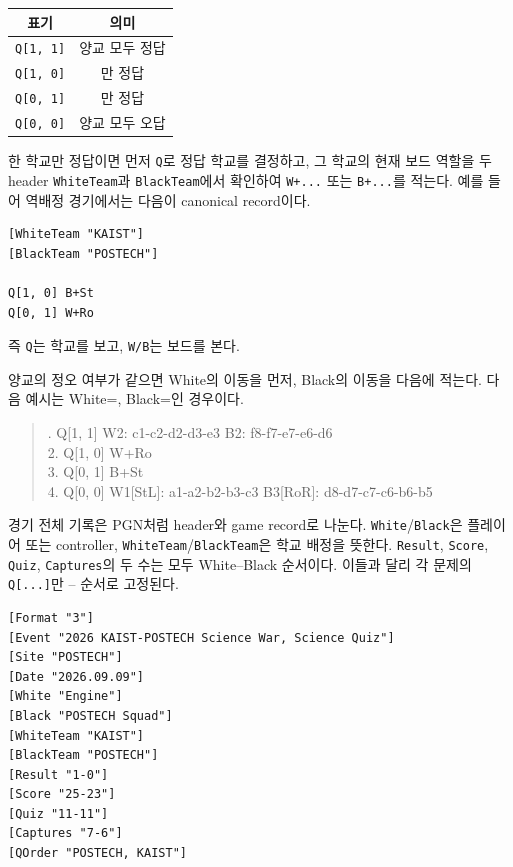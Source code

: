 \begin{center}\renewcommand{\arraystretch}{1.12}\begin{tabular}{@{}cc@{}}\toprule
표기 & 의미 \\\midrule
\texttt{Q[1, 1]} & 양교 모두 정답 \\
\texttt{Q[1, 0]} & \POSTECH{}만 정답 \\
\texttt{Q[0, 1]} & \KAIST{}만 정답 \\
\texttt{Q[0, 0]} & 양교 모두 오답 \\\bottomrule
\end{tabular}\end{center}

한 학교만 정답이면 먼저 \texttt{Q}로 정답 학교를 결정하고, 그 학교의 현재 보드 역할을 두 header \texttt{WhiteTeam}과 \texttt{BlackTeam}에서 확인하여 \texttt{W+...} 또는 \texttt{B+...}를 적는다. 예를 들어 역배정 경기에서는 다음이 canonical record이다.
\begin{Verbatim}[fontsize=\small]
[WhiteTeam "KAIST"]
[BlackTeam "POSTECH"]

Q[1, 0] B+St
Q[0, 1] W+Ro
\end{Verbatim}
즉 \texttt{Q}는 학교를 보고, \texttt{W/B}는 보드를 본다.

양교의 정오 여부가 같으면 White의 이동을 먼저, Black의 이동을 다음에 적는다. 다음 예시는 White=\POSTECH{}, Black=\KAIST{}인 경우이다.
\begin{quote}. Q[1, 1] W2: c1-c2-d2-d3-e3 B2: f8-f7-e7-e6-d6\\
2. Q[1, 0] W+Ro\\
3. Q[0, 1] B+St\\
4. Q[0, 0] W1[StL]: a1-a2-b2-b3-c3 B3[RoR]: d8-d7-c7-c6-b6-b5
\end{quote}

경기 전체 기록은 PGN처럼 header와 game record로 나눈다. \texttt{White}/\texttt{Black}은 플레이어 또는 controller, \texttt{WhiteTeam}/\texttt{BlackTeam}은 학교 배정을 뜻한다. \texttt{Result}, \texttt{Score}, \texttt{Quiz}, \texttt{Captures}의 두 수는 모두 White--Black 순서이다. 이들과 달리 각 문제의 \texttt{Q[...]}만 \POSTECH--\KAIST{} 순서로 고정된다.

\begin{Verbatim}[fontsize=\small]
[Format "3"]
[Event "2026 KAIST-POSTECH Science War, Science Quiz"]
[Site "POSTECH"]
[Date "2026.09.09"]
[White "Engine"]
[Black "POSTECH Squad"]
[WhiteTeam "KAIST"]
[BlackTeam "POSTECH"]
[Result "1-0"]
[Score "25-23"]
[Quiz "11-11"]
[Captures "7-6"]
[QOrder "POSTECH, KAIST"]
\end{Verbatim}

